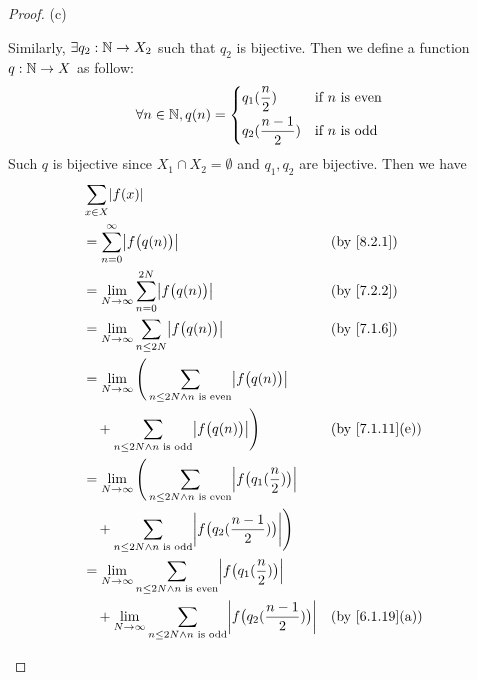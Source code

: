 \begin{proof}{(c)}
\begin{itemize}
		      Similarly, \(\exists q_2 : \mathbb{N} \to X_2\) such that \(q_2\) is bijective.
		      Then we define a function \(q : \mathbb{N} \to X\) as follow:
		      \[
			      \forall n \in \mathbb{N}, q(n) = \begin{dcases}
				      q_1(\dfrac{n}{2})     & \text{if } n \text{ is even} \\
				      q_2(\dfrac{n - 1}{2}) & \text{if } n \text{ is odd}
			      \end{dcases}
		      \]
		      Such \(q\) is bijective since \(X_1 \cap X_2 = \emptyset\) and \(q_1, q_2\) are bijective.
		      Then we have
		      \begin{align*}
			       & \sum_{x \in X} \abs{f(x)}                                                                                                                                   \\
			       & = \sum_{n = 0}^\infty \abs{f\big(q(n)\big)}                                                                               &  & \by{8.2.1}                   \\
			       & = \lim_{N \to \infty} \sum_{n = 0}^{2N} \abs{f\big(q(n)\big)}                                                             &  & \by{7.2.2}                   \\
			       & = \lim_{N \to \infty} \sum_{n \leq 2N} \abs{f\big(q(n)\big)}                                                              &  & \by{7.1.6}                   \\
			       & = \lim_{N \to \infty} \Bigg(\sum_{n \leq 2N \land n \text{ is even}} \abs{f\big(q(n)\big)}                                                                  \\
			       & \quad + \sum_{n \leq 2N \land n \text{ is odd}} \abs{f\big(q(n)\big)}\Bigg)                                               &  & \text{(by \cref{7.1.11}(e))} \\
			       & = \lim_{N \to \infty} \Bigg(\sum_{n \leq 2N \land n \text{ is even}} \abs{f\big(q_1(\dfrac{n}{2})\big)}                                                     \\
			       & \quad + \sum_{n \leq 2N \land n \text{ is odd}} \abs{f\big(q_2(\dfrac{n - 1}{2})\big)}\Bigg)                                                                \\
			       & = \lim_{N \to \infty} \sum_{n \leq 2N \land n \text{ is even}} \abs{f\big(q_1(\dfrac{n}{2})\big)}                                                           \\
			       & \quad + \lim_{N \to \infty} \sum_{n \leq 2N \land n \text{ is odd}} \abs{f\big(q_2(\dfrac{n - 1}{2})\big)}                &  & \text{(by \cref{6.1.19}(a))} \\

\end{align*}
\end{itemize}
\end{proof}
